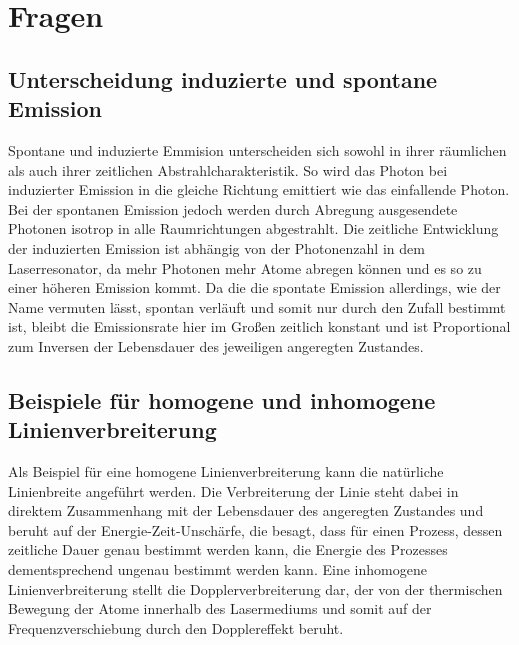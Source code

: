 \section{Fragen}
\subsection{Unterscheidung induzierte und spontane Emission}
Spontane und induzierte Emmision unterscheiden sich sowohl in ihrer räumlichen als auch ihrer zeitlichen Abstrahlcharakteristik. \newline
So wird das Photon bei induzierter Emission in die gleiche Richtung emittiert wie das einfallende Photon. Bei der spontanen Emission jedoch werden durch Abregung ausgesendete Photonen isotrop in alle Raumrichtungen abgestrahlt. \newline
Die zeitliche Entwicklung der induzierten Emission ist abhängig von der Photonenzahl in dem Laserresonator, da mehr Photonen mehr Atome abregen können und es so zu einer höheren Emission kommt. Da die die spontate Emission allerdings, wie der Name vermuten lässt, spontan verläuft und somit nur durch den Zufall bestimmt ist, bleibt die Emissionsrate hier im Großen zeitlich konstant und ist Proportional zum Inversen der Lebensdauer des jeweiligen angeregten Zustandes.
\subsection{Beispiele für homogene und inhomogene Linienverbreiterung} 
Als Beispiel für eine homogene Linienverbreiterung kann die natürliche Linienbreite angeführt werden. Die Verbreiterung der Linie steht dabei in direktem Zusammenhang mit der Lebensdauer des angeregten Zustandes und beruht auf der Energie-Zeit-Unschärfe, die besagt, dass für einen Prozess, dessen zeitliche Dauer genau bestimmt werden kann, die Energie des Prozesses dementsprechend ungenau bestimmt werden kann. \newline
Eine inhomogene Linienverbreiterung stellt die Dopplerverbreiterung dar, der von der thermischen Bewegung der Atome innerhalb des Lasermediums und somit auf der Frequenzverschiebung durch den Dopplereffekt beruht. 
